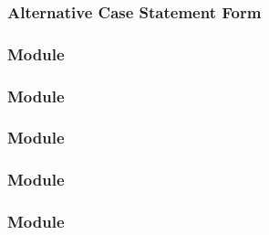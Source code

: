 \documentclass[t, notes, xcolor=table]{beamer}
\begin{document}
\begin{frame}
\frametitle{Alternative Case Statement Form}

\end{frame}

\begin{frame}
\frametitle{Module}

\end{frame}

\begin{frame}
\frametitle{Module}

\end{frame}

\begin{frame}
\frametitle{Module}

\end{frame}

\begin{frame}
\frametitle{Module}

\end{frame}

\begin{frame}
\frametitle{Module}

\end{frame}
\end{document}
